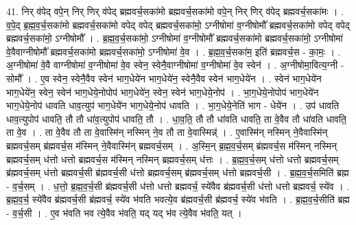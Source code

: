 \documentclass[17pt]{extarticle}
\begin{document}
41. निर् व॑पेद् वपे॒न् निर् णिर् व॑पेद् ब्रह्मवर्च॒सका॑मो ब्रह्मवर्च॒सका॑मो वपे॒न् निर् णिर् व॑पेद् ब्रह्मवर्च॒सका॑मः । . व॒पे॒द् ब्र॒ह्म॒व॒र्च॒सका॑मो ब्रह्मवर्च॒सका॑मो वपेद् वपेद् ब्रह्मवर्च॒सका॑मो॒ ऽग्नीषोमा॑ व॒ग्नीषोमौ᳚ ब्रह्मवर्च॒सका॑मो वपेद् वपेद् ब्रह्मवर्च॒सका॑मो॒ ऽग्नीषोमौ᳚ । . ब्र॒ह्म॒व॒र्च॒सका॑मो॒ ऽग्नीषोमा॑ व॒ग्नीषोमौ᳚ ब्रह्मवर्च॒सका॑मो ब्रह्मवर्च॒सका॑मो॒ ऽग्नीषोमा॑ वे॒वैवाग्नीषोमौ᳚ ब्रह्मवर्च॒सका॑मो ब्रह्मवर्च॒सका॑मो॒ ऽग्नीषोमा॑ वे॒व । . ब्र॒ह्म॒व॒र्च॒सका॑म॒ इति॑ ब्रह्मवर्च॒स - का॒मः॒ । . अ॒ग्नीषोमा॑ वे॒वै वाग्नीषोमा॑ व॒ग्नीषोमा॑ वे॒व स्वेन॒ स्वेनै॒वाग्नीषोमा॑ व॒ग्नीषोमा॑ वे॒व स्वेन॑ । . अ॒ग्नीषोमा॒वित्य॒ग्नी - सोमौ᳚ । . ए॒व स्वेन॒ स्वेनै॒वैव स्वेन॑ भाग॒धेये॑न भाग॒धेये॑न॒ स्वेनै॒वैव स्वेन॑ भाग॒धेये॑न । . स्वेन॑ भाग॒धेये॑न भाग॒धेये॑न॒ स्वेन॒ स्वेन॑ भाग॒धेये॒नोपोप॑ भाग॒धेये॑न॒ स्वेन॒ स्वेन॑ भाग॒धेये॒नोप॑ । . भा॒ग॒धेये॒नोपोप॑ भाग॒धेये॑न भाग॒धेये॒नोप॑ धावति धाव॒त्युप॑ भाग॒धेये॑न भाग॒धेये॒नोप॑ धावति । . भा॒ग॒धेये॒नेति॑ भाग - धेये॑न । . उप॑ धावति धाव॒त्युपोप॑ धावति॒ तौ तौ धा॑व॒त्युपोप॑ धावति॒ तौ । . धा॒व॒ति॒ तौ तौ धा॑वति धावति॒ ता वे॒वैव तौ धा॑वति धावति॒ ता वे॒व । . ता वे॒वैव तौ ता वे॒वास्मि॑न् नस्मिन् ने॒व तौ ता वे॒वास्मिन्न्॑ । . ए॒वास्मि॑न् नस्मिन् ने॒वैवास्मि॑न् ब्रह्मवर्च॒सम् ब्र॑ह्मवर्च॒स म॑स्मिन् ने॒वैवास्मि॑न् ब्रह्मवर्च॒सम् । . अ॒स्मि॒न् ब्र॒ह्म॒व॒र्च॒सम् ब्र॑ह्मवर्च॒स म॑स्मिन् नस्मिन् ब्रह्मवर्च॒सम् ध॑त्तो धत्तो ब्रह्मवर्च॒स म॑स्मिन् नस्मिन् ब्रह्मवर्च॒सम् ध॑त्तः । . ब्र॒ह्म॒व॒र्च॒सम् ध॑त्तो धत्तो ब्रह्मवर्च॒सम् ब्र॑ह्मवर्च॒सम् ध॑त्तो ब्रह्मवर्च॒सी ब्र॑ह्मवर्च॒सी ध॑त्तो ब्रह्मवर्च॒सम् ब्र॑ह्मवर्च॒सम् ध॑त्तो ब्रह्मवर्च॒सी । . ब्र॒ह्म॒व॒र्च॒समिति॑ ब्रह्म - व॒र्च॒सम् । . ध॒त्तो॒ ब्र॒ह्म॒व॒र्च॒सी ब्र॑ह्मवर्च॒सी ध॑त्तो धत्तो ब्रह्मवर्च॒ स्ये॑वैव ब्र॑ह्मवर्च॒सी ध॑त्तो धत्तो ब्रह्मवर्च॒ स्ये॑व । . ब्र॒ह्म॒व॒र्च॒ स्ये॑वैव ब्र॑ह्मवर्च॒सी ब्र॑ह्मवर्च॒ स्ये॑व भ॑वति भवत्ये॒व ब्र॑ह्मवर्च॒सी ब्र॑ह्मवर्च॒ स्ये॑व भ॑वति । . ब्र॒ह्म॒व॒र्च॒सीति॑ ब्रह्म - व॒र्च॒सी । . ए॒व भ॑वति भव त्ये॒वैव भ॑वति॒ यद् यद् भ॑व त्ये॒वैव भ॑वति॒ यत् । \newline
\pagebreak
{}
\end{document}

